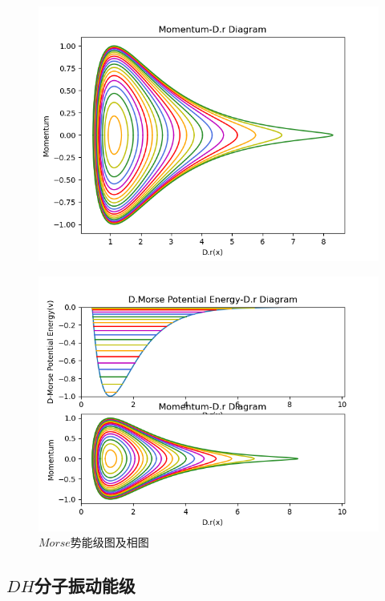 \documentclass[11pt, a4paper, oneside]{ctexart}
\begin{document}
{{{\begin{appendices}
{\begin{figure}[!ht]
            \centering
            \includegraphics[scale=0.75]{h2-2.png}
        \end{figure} 
        \begin{figure}[!ht]
            \caption{ $Morse$势能级图及相图}
	
            \centering
            \includegraphics[scale=0.75]{h2-3.png}
        \end{figure} 
    }

        \newpage
    \subsection{$DH$分子振动能级}

\end{appendices}}}}
\end{document}
